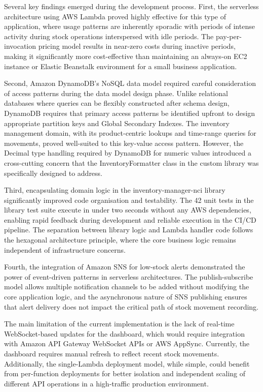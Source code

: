 \documentclass[conference]{IEEEtran}
\begin{document}
Several key findings emerged during the development process. First, the serverless architecture using AWS Lambda proved highly effective for this type of application, where usage patterns are inherently sporadic with periods of intense activity during stock operations interspersed with idle periods. The pay-per-invocation pricing model results in near-zero costs during inactive periods, making it significantly more cost-effective than maintaining an always-on EC2 instance or Elastic Beanstalk environment for a small business application.

Second, Amazon DynamoDB's NoSQL data model required careful consideration of access patterns during the data model design phase. Unlike relational databases where queries can be flexibly constructed after schema design, DynamoDB requires that primary access patterns be identified upfront to design appropriate partition keys and Global Secondary Indexes. The inventory management domain, with its product-centric lookups and time-range queries for movements, proved well-suited to this key-value access pattern. However, the Decimal type handling required by DynamoDB for numeric values introduced a cross-cutting concern that the InventoryFormatter class in the custom library was specifically designed to address.

Third, encapsulating domain logic in the inventory-manager-nci library significantly improved code organisation and testability. The 42 unit tests in the library test suite execute in under two seconds without any AWS dependencies, enabling rapid feedback during development and reliable execution in the CI/CD pipeline. The separation between library logic and Lambda handler code follows the hexagonal architecture principle, where the core business logic remains independent of infrastructure concerns.

Fourth, the integration of Amazon SNS for low-stock alerts demonstrated the power of event-driven patterns in serverless architectures. The publish-subscribe model allows multiple notification channels to be added without modifying the core application logic, and the asynchronous nature of SNS publishing ensures that alert delivery does not impact the critical path of stock movement recording.

The main limitation of the current implementation is the lack of real-time WebSocket-based updates for the dashboard, which would require integration with Amazon API Gateway WebSocket APIs or AWS AppSync. Currently, the dashboard requires manual refresh to reflect recent stock movements. Additionally, the single-Lambda deployment model, while simple, could benefit from per-function deployments for better isolation and independent scaling of different API operations in a high-traffic production environment.
\end{document}
